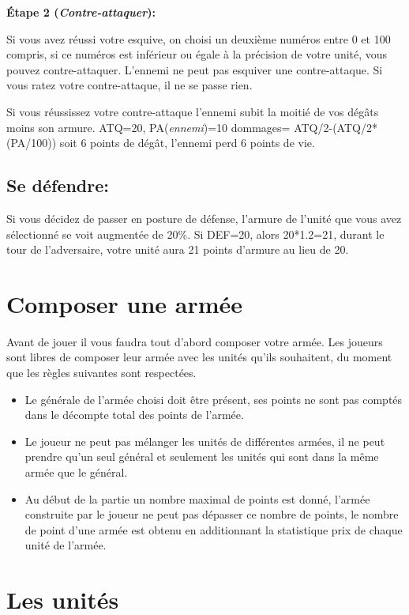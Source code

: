 \documentclass[a4paper]{article}
\begin{document}
	\quad \textbf{Étape 2 (\textit{Contre-attaquer}): }
	
	\quad Si vous avez réussi votre esquive, on choisi un deuxième numéros entre 0 et 100 compris, si ce numéros est inférieur ou égale à la précision de votre unité, vous pouvez contre-attaquer. L'ennemi ne peut pas esquiver une contre-attaque. Si vous ratez votre contre-attaque, il ne se passe rien.
	
	\quad Si vous réussissez votre contre-attaque l'ennemi subit la moitié de vos dégâts moins son armure. ATQ=20, PA(\textit{ennemi})=10 dommages= ATQ/2-(ATQ/2*(PA/100)) soit 6 points de dégât, l'ennemi perd 6 points de vie.

	\subsection{Se défendre: }
	
	\quad Si vous décidez de passer en posture de défense, l'armure de l'unité que vous avez sélectionné se voit augmentée de 20\%. Si DEF=20, alors 20*1.2=21, durant le tour de l'adversaire, votre unité aura 21 points d'armure au lieu de 20.

\section{Composer une armée}

	\quad Avant de jouer il vous faudra tout d'abord composer votre armée. Les joueurs sont libres de composer leur armée avec les unités qu'ils souhaitent, du moment que les règles suivantes sont respectées.
	\begin{itemize}
		\item Le générale de l'armée choisi doit être présent, ses points ne sont pas comptés dans le décompte total des points de l'armée.
		\item Le joueur ne peut pas mélanger les unités de différentes armées, il ne peut prendre qu'un seul général et seulement les unités qui sont dans la même armée que le général.
		\item Au début de la partie un nombre maximal de points est donné, l'armée construite par le joueur ne peut pas dépasser ce nombre de points, le nombre de point d'une armée est obtenu en additionnant la statistique prix de chaque unité de l'armée.
	\end{itemize}

	\newpage
\section{Les unités}
\end{document}
